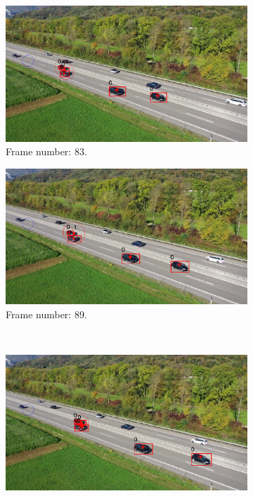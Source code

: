 \begin{figure}[H]
    \centering
    \begin{subfigure}{0.48\textwidth}
        \centering
        \includegraphics[width=\linewidth]{../../../experiments/E1/V2/YOLO/83}
        \caption{Frame number: 83.}
        \label{fig:E1-V2-S1:01}
    \end{subfigure}
    \begin{subfigure}{0.48\textwidth}
        \centering
        \includegraphics[width=\linewidth]{../../../experiments/E1/V2/YOLO/89}
        \caption{Frame number: 89.}
        \label{fig:E1-V2-S1:02}
    \end{subfigure}
    \\
    \begin{subfigure}{0.48\textwidth}
        \centering
        \includegraphics[width=\linewidth]{../../../experiments/E1/V2/YOLO/94}

\end{subfigure}
\end{figure}
